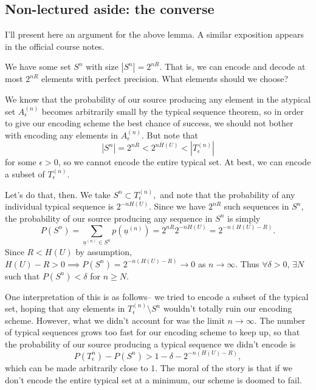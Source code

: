 \subsection*{Non-lectured aside: the converse} I'll present here an argument for the above lemma. A similar exposition appears in the official course notes.

We have some set $S^n$ with size $|S^n|=2^{nR}$. That is, we can encode and decode at most $2^{nR}$ elements with perfect precision. What elements should we choose?

We know that the probability of our source producing any element in the atypical set $A_\epsilon^{(n)}$ becomes arbitrarily small by the typical sequence theorem, so in order to give our encoding scheme the best chance of success, we should not bother with encoding any elements in $A_\epsilon^{(n)}$.
But note that
\begin{equation*}
    |S^n| = 2^{nR} < 2^{nH(U)} <|T_\epsilon^{(n)}|
\end{equation*}
for some $\epsilon >0$, so we cannot encode the entire typical set. At best, we can encode a subset of $T_\epsilon^{(n)}.$

Let's do that, then. We take $S^n \subset T_\epsilon^{(n)},$ and note that the probability of any individual typical sequence is $2^{-nH(U)}$. Since we have $2^{nR}$ such sequences in $S^n$, the probability of our source producing any sequence in $S^n$ is simply
\begin{equation}
    P(S^n)=\sum_{\underline{u}^{(n)}\in S^n} p(\underline{u}^{(n)})=2^{nR} 2^{-nH(U)}=2^{-n(H(U)-R)}.
\end{equation}
Since $R < H(U)$ by assumption, $H(U)-R > 0 \implies P(S^n)= 2^{-n(H(U)-R)} \to 0$ as $n\to\infty$. Thus $\forall \delta >0$, $\exists N$ such that $P(S^n)< \delta$ for $n\geq N$.

One interpretation of this is as follows-- we tried to encode a subset of the typical set, hoping that any elements in $T_\epsilon^{(n)} \setminus S^n$ wouldn't totally ruin our encoding scheme. However, what we didn't account for was the limit $n\to \infty$. The number of typical sequences grows too fast for our encoding scheme to keep up, so that the probability of our source producing a typical sequence we didn't encode is
\begin{equation}
    P(T_\epsilon^{{n}})-P(S^n) > 1-\delta - 2^{-n(H(U)-R)},
\end{equation}
which can be made arbitrarily close to $1$. The moral of the story is that if we don't encode the entire typical set at a minimum, our scheme is doomed to fail.